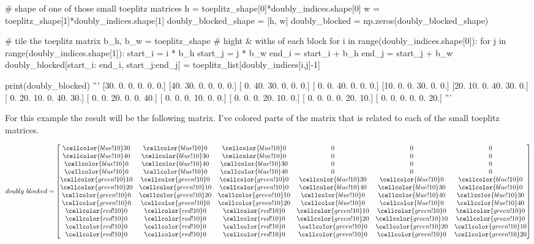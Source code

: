 \documentclass[11pt]{article}
\newcommand\x{\cellcolor{red!10}}
\newcommand\y{\cellcolor{green!10}}
\newcommand\z{\cellcolor{blue!10}}
\begin{document}
	\vspace{10mm}
	\begin{python} 
	# shape of one of those small toeplitz matrices
	h = toeplitz_shape[0]*doubly_indices.shape[0]
	w = toeplitz_shape[1]*doubly_indices.shape[1]
	doubly_blocked_shape = [h, w]
	doubly_blocked = np.zeros(doubly_blocked_shape)
	
	# tile the toeplitz matrix 
	b_h, b_w = toeplitz_shape # hight & withs of each block
	for i in range(doubly_indices.shape[0]):
	 for j in range(doubly_indices.shape[1]):
	  start_i = i * b_h
	  start_j = j * b_w
	  end_i = start_i + b_h
	  end_j = start_j + b_w
	  doubly_blocked[start_i: end_i, start_j:end_j] =
	                     toeplitz_list[doubly_indices[i,j]-1]
	
	print(doubly_blocked)
	'''
	[30.  0.  0.  0.  0.  0.]
	[40. 30.  0.  0.  0.  0.]
	[ 0. 40. 30.  0.  0.  0.]
	[ 0.  0. 40.  0.  0.  0.]
	[10.  0.  0. 30.  0.  0.]
	[20. 10.  0. 40. 30.  0.]
	[ 0. 20. 10.  0. 40. 30.]
	[ 0.  0. 20.  0.  0. 40.]
	[ 0.  0.  0. 10.  0.  0.]
	[ 0.  0.  0. 20. 10.  0.]
	[ 0.  0.  0.  0. 20. 10.]
	[ 0.  0.  0.  0.  0. 20.]
	'''
	\end{python}
	\vspace{10mm}
	For this example the result will be the following matrix. I've colored parts of the matrix that is related to each of the small toeplitz matrices.
	
	\begin{equation}
	doubly \ blocked = 
	\begin{bmatrix}
	
	\z 30 & \z 0 & \z 0 & 0 & 0 & 0 \\
	\z 40 & \z 30 & \z 0 & 0 & 0 & 0 \\
	\z 0 & \z 40 & \z 30 & 0 & 0 & 0 \\
	\z 0 & \z 0 & \z 40  & 0 & 0 & 0 \\
	
	\y 10 & \y 0 & \y 0 & \z 30 & \z 0 & \z 0 \\
	\y 20 & \y 10 & \y 0 & \z 40 & \z 30 & \z 0 \\
	\y 0 & \y 20 & \y 10 & \z 0 & \z 40 & \z 30 \\
	\y 0 & \y 0 & \y 20  & \z 0 & \z 0 & \z 40  \\
	
	\x 0 & \x 0 & \x 0 &  \y 10 & \y 0 & \y 0 \\
	\x 0 & \x 0 & \x 0 & \y 20 & \y 10 & \y 0 \\
	\x 0 & \x 0 & \x 0 & \y 0 & \y 20 & \y 10 \\
	\x 0 & \x 0 & \x 0 & \y 0 & \y 0 & \y 20 \\
	
	\end{bmatrix}
	\end{equation}
	
\end{document}
